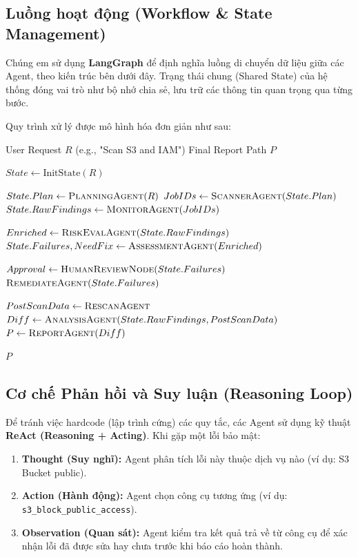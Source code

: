 \subsection{Luồng hoạt động (Workflow & State Management)}
Chúng em sử dụng \textbf{LangGraph} để định nghĩa luồng di chuyển dữ liệu giữa các Agent, theo kiến trúc bên dưới đây. Trạng thái chung (Shared State) của hệ thống đóng vai trò như bộ nhớ chia sẻ, lưu trữ các thông tin quan trọng qua từng bước.



Quy trình xử lý được mô hình hóa đơn giản như sau:
\begin{algorithm}[H]
\caption{AWS Security Audit Workflow (LangGraph Orchestration)}
\label{alg:workflow_real}
\begin{algorithmic}[1]
\Require User Request $R$ (e.g., "Scan S3 and IAM")
\Ensure Final Report Path $P$

\State $State \leftarrow \text{InitState}(R)$

\State $State.Plan \leftarrow \Call{PlanningAgent}{R}$ 
\State $JobIDs \leftarrow \Call{ScannerAgent}{State.Plan}$
\State $State.RawFindings \leftarrow \Call{MonitorAgent}{JobIDs}$ 

\State $Enriched \leftarrow \Call{RiskEvalAgent}{State.RawFindings}$ 
\State $State.Failures, NeedFix \leftarrow \Call{AssessmentAgent}{Enriched}$ 

    \State $Approval \leftarrow \Call{HumanReviewNode}{State.Failures}$ 
        \State $\Call{RemediateAgent}{State.Failures}$ 
    \EndIf
\EndIf

\State $PostScanData \leftarrow \Call{RescanAgent}{}$ 
\State $Diff \leftarrow \Call{AnalysisAgent}{State.RawFindings, PostScanData}$ 
\State $P \leftarrow \Call{ReportAgent}{Diff}$ 

\State \Return $P$
\end{algorithmic}
\end{algorithm}
\subsection{Cơ chế Phản hồi và Suy luận (Reasoning Loop)}

Để tránh việc hardcode (lập trình cứng) các quy tắc, các Agent sử dụng kỹ thuật \textbf{ReAct (Reasoning + Acting)}. Khi gặp một lỗi bảo mật:
\begin{enumerate}
    \item \textbf{Thought (Suy nghĩ):} Agent phân tích lỗi này thuộc dịch vụ nào (ví dụ: S3 Bucket public).
    \item \textbf{Action (Hành động):} Agent chọn công cụ tương ứng (ví dụ: \texttt{s3\_block\_public\_access}).
    \item \textbf{Observation (Quan sát):} Agent kiểm tra kết quả trả về từ công cụ để xác nhận lỗi đã được sửa hay chưa trước khi báo cáo hoàn thành.
\end{enumerate}